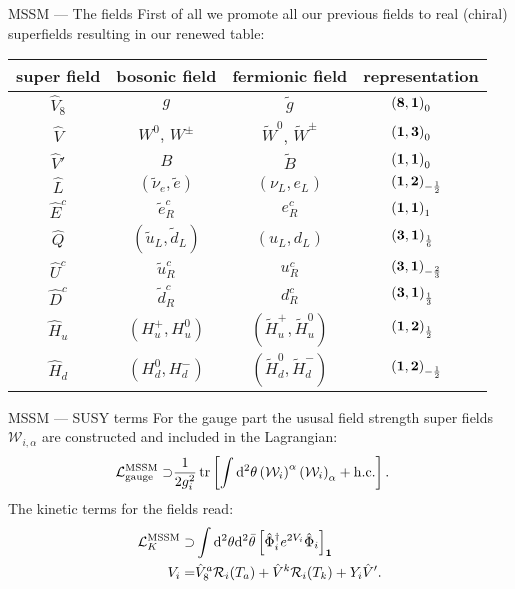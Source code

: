 \begin{frame}{MSSM — The fields}
First of all we promote all our previous fields to real (chiral) superfields resulting in our renewed table:\vfill
\begin{table}
\begin{tabular}{cccl}
  super field& bosonic field& fermionic field& representation\\\hline
  $\hat{V}_8$& $g$& $\tilde{g}$& $\quad\quad\left(\mathbf{8}, \mathbf{1}\right)_{0}$\\
  $\hat{V}$& $W^0$, $W^\pm$& $\tilde{W}^0$, $\tilde{W}^\pm$& $\quad\quad\left(\mathbf{1}, \mathbf{3}\right)_{0}$\\
  $\hat{V}'$& $B$& $\tilde{B}$& $\quad\quad\left(\mathbf{1}, \mathbf{1}\right)_{0}$\\
  $\hat{L}$& $\left(\tilde{\nu}_e, \tilde{e}\right)$& $\left(\nu_L, e_L\right)$& $\quad\quad\left(\mathbf{1}, \mathbf{2}\right)_{-\frac12}$\\
  $\hat{E}^c$& $\tilde{e}_R^c$& $e_R^c$& $\quad\quad\left(\mathbf{1}, \mathbf{1}\right)_{1}$\\
  $\hat{Q}$& $\left(\tilde{u}_L, \tilde{d}_L\right)$& $\left(u_L, d_L\right)$& $\quad\quad\left(\mathbf{3}, \mathbf{1}\right)_{\frac16}$\\
  $\hat{U}^c$& $\tilde{u}_R^c$& $u_R^c$& $\quad\quad\left(\mathbf{3}, \mathbf{1}\right)_{-\frac23}$\\
  $\hat{D}^c$& $\tilde{d}_R^c$& $d_R^c$& $\quad\quad\left(\mathbf{3}, \mathbf{1}\right)_{\frac13}$\\
  $\hat{H}_u$& $\left(H_u^+, H_u^0\right)$& $\left(\tilde{H}_u^+, \tilde{H}_u^0\right)$& $\quad\quad\left(\mathbf{1}, \mathbf{2}\right)_{\frac12}$\\
  $\hat{H}_d$& $\left(H_d^0, H_d^-\right)$& $\left(\tilde{H}^0_d, \tilde{H}_d^-\right)$& $\quad\quad\left(\mathbf{1}, \mathbf{2}\right)_{-\frac12}$
\end{tabular}
\end{table}
\end{frame}

\begin{frame}{MSSM — SUSY terms}
For the gauge part the ususal field strength super fields $\mathcal{W}_{i, \alpha}$ are constructed and included in the Lagrangian:
\begin{align}
  \mathcal{L}^\mathrm{MSSM}_\mathrm{gauge}\supset&\frac1{2g_i^2}\tr\left[\int\dd^2\theta\left(\mathcal{W}_i\right)^\alpha\left(\mathcal{W}_i\right)_\alpha+\mathrm{h. c.}\right].
\end{align}
The kinetic terms for the fields read:
\begin{align}
  \mathcal{L}^\mathrm{MSSM}_K\supset&\int\dd^2\theta\dd^2\bar{\theta}\left[\hat{\Phi}^\dagger_ie^{2V_i}\hat{\Phi}_i\right]_{\mathbf{1}}\\
  V_i=&\hat{V}_8^a\mathcal{R}_i(T_a)+\hat{V}^k\mathcal{R}_i(T_k)+Y_i\hat{V}'.
\end{align}
\end{frame}

